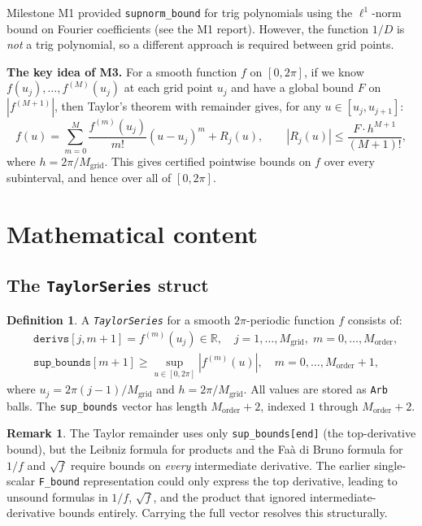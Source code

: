 \documentclass[11pt]{article}
\theoremstyle{definition}
\newtheorem{definition}{Definition}
\newtheorem{remark}{Remark}
\begin{document}
Milestone M1 provided \texttt{supnorm\_bound} for trig polynomials using the
$\ell^1$-norm bound on Fourier coefficients (see the M1 report).
However, the function $1/D$ is \emph{not} a trig polynomial, so a different
approach is required between grid points.

\textbf{The key idea of M3.}
For a smooth function $f$ on $[0,2\pi]$, if we know $f(u_j),\ldots,f^{(M)}(u_j)$
at each grid point $u_j$ and have a global bound $F$ on $|f^{(M+1)}|$, then
Taylor's theorem with remainder gives, for any $u \in [u_j, u_{j+1}]$:
\begin{equation}\label{eq:taylor}
  f(u) = \sum_{m=0}^{M} \frac{f^{(m)}(u_j)}{m!}(u - u_j)^m + R_j(u),
  \qquad |R_j(u)| \le \frac{F \cdot h^{M+1}}{(M+1)!},
\end{equation}
where $h = 2\pi / M_{\mathrm{grid}}$.
This gives certified pointwise bounds on $f$ over every subinterval, and hence
over all of $[0,2\pi]$.

\section{Mathematical content}

\subsection{The \texttt{TaylorSeries} struct}

\begin{definition}
A \emph{\texttt{TaylorSeries}} for a smooth $2\pi$-periodic function $f$
consists of:
\begin{align*}
  &\texttt{derivs}[j, m+1] = f^{(m)}(u_j) \in \mathbb{R},
  \quad j = 1,\ldots,M_{\mathrm{grid}},\; m = 0,\ldots,M_{\mathrm{order}},\\
  &\texttt{sup\_bounds}[m+1] \ge \sup_{u \in [0,2\pi]} |f^{(m)}(u)|,
  \quad m = 0,\ldots,M_{\mathrm{order}}+1,
\end{align*}
where $u_j = 2\pi(j-1)/M_{\mathrm{grid}}$ and $h = 2\pi/M_{\mathrm{grid}}$.
All values are stored as \texttt{Arb} balls. The \texttt{sup\_bounds} vector
has length $M_{\mathrm{order}}+2$, indexed $1$ through $M_{\mathrm{order}}+2$.
\end{definition}

\begin{remark}
The Taylor remainder uses only \texttt{sup\_bounds[end]} (the top-derivative
bound), but the Leibniz formula for products and the Faà di Bruno formula
for $1/f$ and $\sqrt{f}$ require bounds on \emph{every} intermediate derivative.
The earlier single-scalar \texttt{F\_bound} representation could only express
the top derivative, leading to unsound formulas in $1/f$, $\sqrt{f}$, and the
product that ignored intermediate-derivative bounds entirely. Carrying the
full vector resolves this structurally.
\end{remark}
\end{document}
